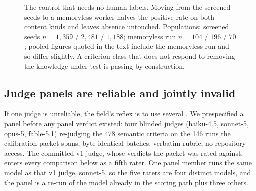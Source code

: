 \documentclass[11pt]{article}
\newcommand{\code}[1]{\texttt{\small #1}}
\begin{document}
\begin{figure}[tb]
\centering
{}
\caption{The control that needs no human labels. Moving from the screened
seeds to a memoryless worker halves the positive rate on both content kinds
and leaves absence untouched. Populations: screened seeds $n=1{,}359$ /
$2{,}481$ / $1{,}188$; memoryless run $n=104$ / $196$ / $70$; pooled figures
quoted in the text include the memoryless run and so differ slightly. A
criterion class that does not respond to removing the knowledge under test is
passing by construction.}
\label{fig:kinds}
\end{figure}

\subsection{Judge panels are reliable and jointly invalid}

If one judge is unreliable, the field's reflex is to use several \cite{judge}.
We prespecified a panel before any panel verdict existed: four blinded judges
(haiku-4.5, sonnet-5, opus-5, fable-5.1) re-judging the 478 semantic criteria
on the 146 runs the calibration packet spans, byte-identical batches, verbatim
rubric, no repository access. The committed v1 judge, whose verdicts the packet
was rated against, enters every comparison below as a fifth rater. One panel
member runs the same model as that v1 judge, sonnet-5, so the five raters are
four distinct models, and the panel is a re-run of the model already in the
scoring path plus three others.
\end{document}
